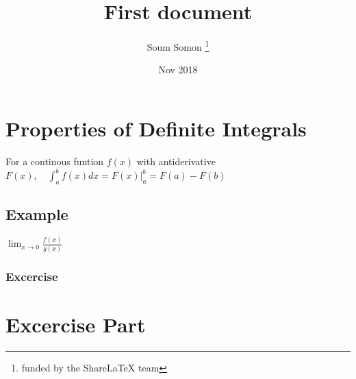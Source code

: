 \documentclass[12pt,a4paper]{article}
\title{First document}
\author{Soum Somon \thanks{funded by the ShareLaTeX team}}
\date{Nov 2018}
\begin{document}
	\maketitle
	\newpage
	\section{Properties of Definite Integrals}
	For a continous funtion $f(x)$ with antiderivative $F(x),\quad\int_{a}^{b}		f(x)dx=F(x)\vert_{a}^{b}=F(a)-F(b)$
		\subsection{Example}
		$\lim_{x\to0}\frac{f(x)}{g(x)}$
		\subsubsection{Excercise}
	\section{Excercise Part}
	
\end{document}
